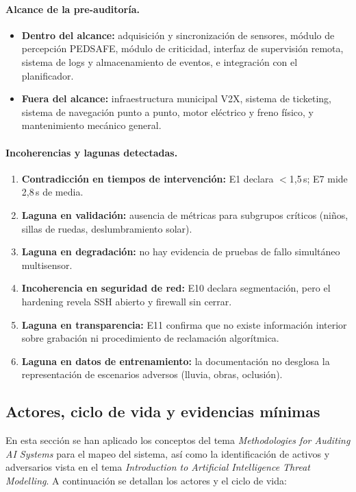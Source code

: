 \documentclass[11pt]{article}
\begin{document}
\paragraph{Alcance de la pre-auditoría.}
\begin{itemize}[nosep]
    \item \textbf{Dentro del alcance:} adquisición y sincronización de sensores, módulo de percepción PEDSAFE, módulo de criticidad, interfaz de supervisión remota, sistema de logs y almacenamiento de eventos, e integración con el planificador.
    \item \textbf{Fuera del alcance:} infraestructura municipal V2X, sistema de ticketing, sistema de navegación punto a punto, motor eléctrico y freno físico, y mantenimiento mecánico general.
\end{itemize}

\paragraph{Incoherencias y lagunas detectadas.}
\begin{enumerate}[nosep]
    \item \textbf{Contradicción en tiempos de intervención:} E1 declara $<$1,5\,s; E7 mide 2,8\,s de media.
    \item \textbf{Laguna en validación:} ausencia de métricas para subgrupos críticos (niños, sillas de ruedas, deslumbramiento solar).
    \item \textbf{Laguna en degradación:} no hay evidencia de pruebas de fallo simultáneo multisensor.
    \item \textbf{Incoherencia en seguridad de red:} E10 declara segmentación, pero el hardening revela SSH abierto y firewall sin cerrar.
    \item \textbf{Laguna en transparencia:} E11 confirma que no existe información interior sobre grabación ni procedimiento de reclamación algorítmica.
    \item \textbf{Laguna en datos de entrenamiento:} la documentación no desglosa la representación de escenarios adversos (lluvia, obras, oclusión).
\end{enumerate}

\subsection{Actores, ciclo de vida y evidencias mínimas}
En esta sección se han aplicado los conceptos del tema \textit{Methodologies for Auditing AI Systems} para el mapeo del sistema, así como la identificación de activos y adversarios vista en el tema \textit{Introduction to Artificial Intelligence Threat Modelling}. A continuación se detallan los actores y el ciclo de vida:
\end{document}
